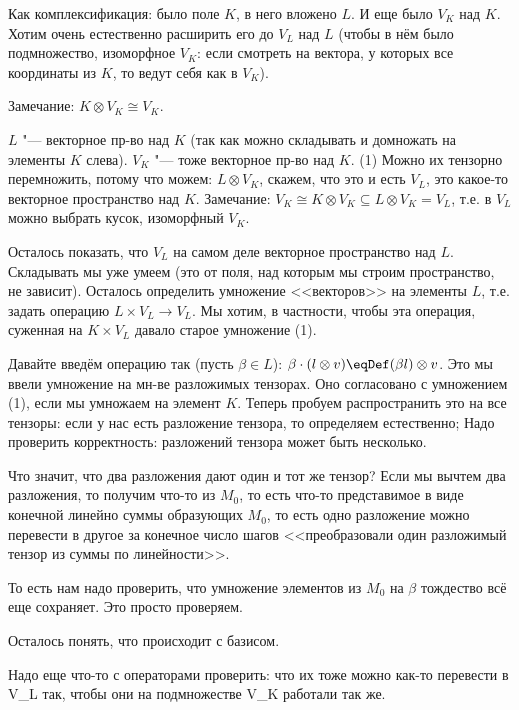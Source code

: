 Как комплексификация: было поле $K$, в него вложено $L$.
И еще было $V_K$ над $K$.
Хотим очень естественно расширить его до $V_L$ над $L$
(чтобы в нём было подмножество, изоморфное $V_K$: если смотреть на
вектора, у которых все координаты из $K$, то ведут себя как в $V_K$).

Замечание: $K \otimes V_K \cong V_K$.

$L$ "--- векторное пр-во над $K$ (так как можно складывать и домножать на элементы $K$ слева).
$V_K$ "--- тоже векторное пр-во над $K$.
(1) Можно их тензорно перемножить, потому что можем: $L \otimes V_K$, скажем, что это и есть $V_L$,
это какое-то векторное пространство над $K$.
Замечание: $V_K \cong K \otimes V_K \subseteq L \otimes V_K = V_L$, т.е. в $V_L$ можно
выбрать кусок, изоморфный $V_K$.

Осталось показать, что $V_L$ на самом деле векторное пространство над $L$.
Складывать мы уже умеем (это от поля, над которым мы строим пространство, не зависит).
Осталось определить умножение <<векторов>> на элементы $L$, т.е. задать операцию $L \times V_L \to V_L$.
Мы хотим, в частности, чтобы эта операция, суженная на $K \times V_L$ давало старое умножение (1).

Давайте введём операцию так (пусть $\beta \in L$): $\beta \cdot (l \otimes v) \eqDef (\beta l) \otimes v$.
Это мы ввели умножение на мн-ве разложимых тензорах.
Оно согласовано с умножением (1), если мы умножаем на элемент $K$.
Теперь пробуем распространить это на все тензоры: если у нас есть разложение тензора,
то определяем естественно; Надо проверить корректность: разложений тензора может быть несколько.

Что значит, что два разложения дают один и тот же тензор?
Если мы вычтем два разложения, то получим что-то из $M_0$, то есть
что-то представимое в виде конечной линейно суммы образующих $M_0$,
то есть одно разложение можно перевести в другое за конечное число шагов
<<преобразовали один разложимый тензор из суммы по линейности>>.

То есть нам надо проверить, что умножение элементов из $M_0$ на $\beta$ тождество всё
еще сохраняет.
Это просто проверяем.

Осталось понять, что происходит с базисом.

Надо еще что-то с операторами проверить: что их тоже можно как-то перевести в V_L так, чтобы
они на подмножестве V_K работали так же.
